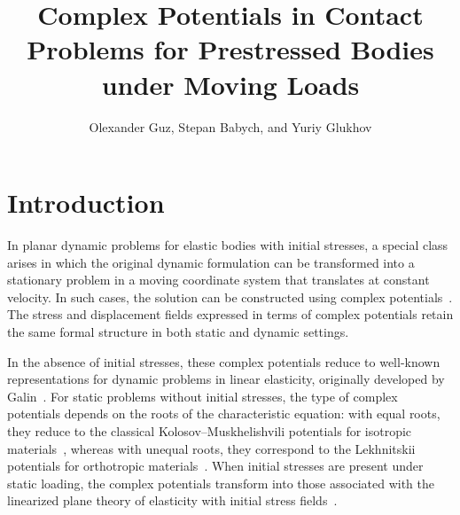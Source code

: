 
\title{Complex Potentials in Contact Problems for Prestressed Bodies under Moving Loads}

\author{Olexander Guz, Stepan Babych, and Yuriy Glukhov}


\maketitle

\graphicspath{{13_GuzBabych/}}





\section{Introduction}

In planar dynamic problems for elastic bodies with initial stresses, a special class arises in which the original dynamic formulation can be transformed into a stationary problem in a moving coordinate system that translates at constant velocity. In such cases, the solution can be constructed using complex potentials~\cite{GuzBabych9}. The stress and displacement fields expressed in terms of complex potentials retain the same formal structure in both static and dynamic settings.

In the absence of initial stresses, these complex potentials reduce to well-known representations for dynamic problems in linear elasticity, originally developed by Galin~\cite{GuzBabych8}. For static problems without initial stresses, the type of complex potentials depends on the roots of the characteristic equation: with equal roots, they reduce to the classical Kolosov--Muskhelishvili potentials for isotropic materials~\cite{GuzBabych13}, whereas with unequal roots, they correspond to the Lekhnitskii potentials for orthotropic materials~\cite{GuzBabych12}. When initial stresses are present under static loading, the complex potentials transform into those associated with the linearized plane theory of elasticity with initial stress fields~\cite{GuzBabych9}.


